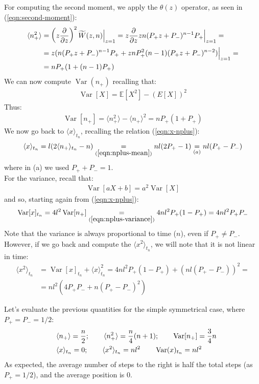 \documentclass[../template.tex]{subfiles}
\begin{document}
For computing the second moment, we apply the $\theta(z)$ operator, as seen in (\ref{eqn:second-moment}):
\begin{align} \nonumber
    \langle n_+^2 \rangle &= \left(z \pdv{z} \right)^2 \widetilde{W}(z,n) \Big|_{z=1}= z\pdv{z} zn(P_+ z +P_-)^{n-1}P_+ \Big|_{z=1}=\\
    \nonumber
    &= z(n(P_+ z + P_-)^{n-1}P_+ + znP_+^2 (n-1) (P_+ z + P_-)^{n-2}) \Big|_{z=1} =\\
    &= nP_+ (1+(n-1)P_+)
    \label{eqn:nplus-secondmoment}
\end{align}
We can now compute $\operatorname{Var}(n_+)$ recalling that:
\begin{align*}
    \operatorname{Var}[X] = \mathbb{E}[X^2] - (E[X])^2 
\end{align*} 
Thus:
\begin{align}
    \operatorname{Var}[n_+] = \langle n_+^2 \rangle - \langle n_+ \rangle^2 = nP_+ (1+P_+)
    \label{eqn:nplus-variance}
\end{align}
We now go back to $\langle x \rangle_{t_n}$, recalling the relation (\ref{eqn:x-nplus}):
\begin{align*}
    \langle x \rangle_{t_n} = l(2 \langle n_+ \rangle_{t_n} - n) \underset{(\ref{eqn:nplus-mean})}{=} nl(2P_+ - 1) \underset{(a)}{=}  nl(P_+ - P_-)
\end{align*}
where in (a) we used $P_+ + P_- = 1$.\\
For the variance, recall that:
\begin{align*}
    \operatorname{Var}[aX + b] = a^2\operatorname{Var}[X]  
\end{align*} 
and so, starting again from (\ref{eqn:x-nplus}):
\begin{align*}
    \operatorname{Var}[x]_{t_n} = 4l^2 \operatorname{Var}[n_+] \underset{(\ref{eqn:nplus-variance})}{=}  4nl^2 P_+(1-P_+) = 4nl^2 P_+ P_-
\end{align*}
Note that the variance is always proportional to time ($n$), even if $P_+ \neq P_-$. However, if we go back and compute the $\langle x^2 \rangle_{t_n}$, we will note that it is not linear in time:
\begin{align*}
    \langle x^2 \rangle_{t_n} &= \operatorname{Var}[x]_{t_n} + \langle x \rangle_{t_n}^2 = 4nl^2 P_+(1-P_+) + (nl(P_+ - P_-))^2 =\\
    &= nl^2 (4P_+P_- + n(P_+ - P_-)^2)
\end{align*} 

Let's evaluate the previous quantities for the simple symmetrical case, where $P_+ = P_- = 1/2$:
\begin{align*}
    \langle n_+ \rangle = \frac{n}{2}; \qquad \langle n_+^2 \rangle = \frac{n}{4}(n+1); \qquad \operatorname{Var}[n_+] = \frac{3}{4}n\\
    \langle x \rangle_{t_n} = 0;\qquad \langle x^2 \rangle_{t_n} = nl^2 \qquad \operatorname{Var}(x)_{t_n} = nl^2 \span    
\end{align*}
As expected, the average number of steps to the right is half the total steps (as $P_+ = 1/2$), and the average position is $0$. 
\end{document}
